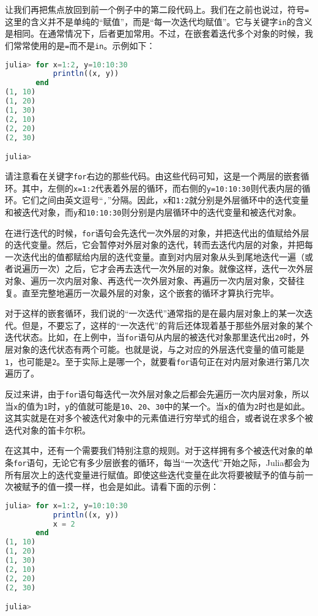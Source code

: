 让我们再把焦点放回到前一个例子中的第二段代码上。我们在之前也说过，符号\verb|=|这里的含义并不是单纯的“赋值”，而是“每一次迭代均赋值”。它与关键字\verb|in|的含义是相同。在通常情况下，后者更加常用。不过，在嵌套着迭代多个对象的时候，我们常常使用的是\verb|=|而不是\verb|in|。示例如下：
\begin{lstlisting}[language=julia]
julia> for x=1:2, y=10:10:30
           println((x, y))
       end
(1, 10)
(1, 20)
(1, 30)
(2, 10)
(2, 20)
(2, 30)

julia>
\end{lstlisting}

请注意看在关键字\verb|for|右边的那些代码。由这些代码可知，这是一个两层的嵌套循环。其中，左侧的\verb|x=1:2|代表着外层的循环，而右侧的\verb|y=10:10:30|则代表内层的循环。它们之间由英文逗号“\verb|,|”分隔。因此，\verb|x|和\verb|1:2|就分别是外层循环中的迭代变量和被迭代对象，而\verb|y|和\verb|10:10:30|则分别是内层循环中的迭代变量和被迭代对象。

在进行迭代的时候，\verb|for|语句会先迭代一次外层的对象，并把迭代出的值赋给外层的迭代变量。然后，它会暂停对外层对象的迭代，转而去迭代内层的对象，并把每一次迭代出的值都赋给内层的迭代变量。直到对内层对象从头到尾地迭代一遍（或者说遍历一次）之后，它才会再去迭代一次外层的对象。就像这样，迭代一次外层对象、遍历一次内层对象、再迭代一次外层对象、再遍历一次内层对象，交替往复。直至完整地遍历一次最外层的对象，这个嵌套的循环才算执行完毕。

对于这样的嵌套循环，我们说的“一次迭代”通常指的是在最内层对象上的某一次迭代。但是，不要忘了，这样的“一次迭代”的背后还体现着基于那些外层对象的某个迭代状态。比如，在上例中，当\verb|for|语句从内层的被迭代对象那里迭代出\verb|20|时，外层对象的迭代状态有两个可能。也就是说，与之对应的外层迭代变量的值可能是\verb|1|，也可能是\verb|2|。至于实际上是哪一个，就要看\verb|for|语句正在对内层对象进行第几次遍历了。

反过来讲，由于\verb|for|语句每迭代一次外层对象之后都会先遍历一次内层对象，所以当\verb|x|的值为\verb|1|时，\verb|y|的值就可能是\verb|10|、\verb|20|、\verb|30|中的某一个。当\verb|x|的值为\verb|2|时也是如此。这其实就是在对多个被迭代对象中的元素值进行穷举式的组合，或者说在求多个被迭代对象的笛卡尔积。

在这其中，还有一个需要我们特别注意的规则。对于这样拥有多个被迭代对象的单条\verb|for|语句，无论它有多少层嵌套的循环，每当“一次迭代”开始之际，Julia都会为所有层次上的迭代变量进行赋值。即使这些迭代变量在此次将要被赋予的值与前一次被赋予的值一摸一样，也会是如此。请看下面的示例：
\begin{lstlisting}[language=julia]
julia> for x=1:2, y=10:10:30
           println((x, y))
           x = 2
       end
(1, 10)
(1, 20)
(1, 30)
(2, 10)
(2, 20)
(2, 30)

julia> 
\end{lstlisting}

